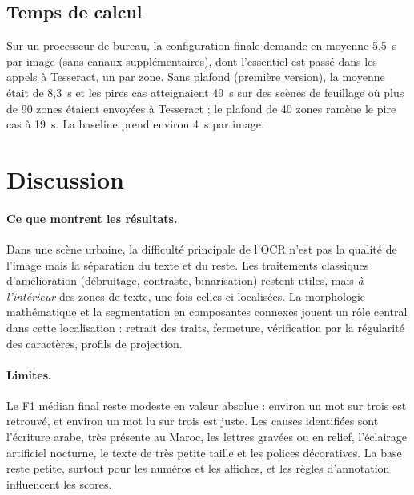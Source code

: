 \documentclass[11pt,a4paper]{article}
\begin{document}
\subsection{Temps de calcul}
Sur un processeur de bureau, la configuration finale demande en moyenne 5,5~s par image (sans canaux supplémentaires), dont l'essentiel est passé dans les appels à Tesseract, un par zone. Sans plafond (première version), la moyenne était de 8,3~s et les pires cas atteignaient 49~s sur des scènes de feuillage où plus de 90 zones étaient envoyées à Tesseract ; le plafond de 40 zones ramène le pire cas à 19~s. La baseline prend environ 4~s par image.

\section{Discussion}

\paragraph{Ce que montrent les résultats.} Dans une scène urbaine, la difficulté principale de l'OCR n'est pas la qualité de l'image mais la séparation du texte et du reste. Les traitements classiques d'amélioration (débruitage, contraste, binarisation) restent utiles, mais \emph{à l'intérieur} des zones de texte, une fois celles-ci localisées. La morphologie mathématique et la segmentation en composantes connexes jouent un rôle central dans cette localisation : retrait des traits, fermeture, vérification par la régularité des caractères, profils de projection.

\paragraph{Limites.} Le F1 médian final reste modeste en valeur absolue : environ un mot sur trois est retrouvé, et environ un mot lu sur trois est juste. Les causes identifiées sont l'écriture arabe, très présente au Maroc, les lettres gravées ou en relief, l'éclairage artificiel nocturne, le texte de très petite taille et les polices décoratives. La base reste petite, surtout pour les numéros et les affiches, et les règles d'annotation influencent les scores.
\end{document}
